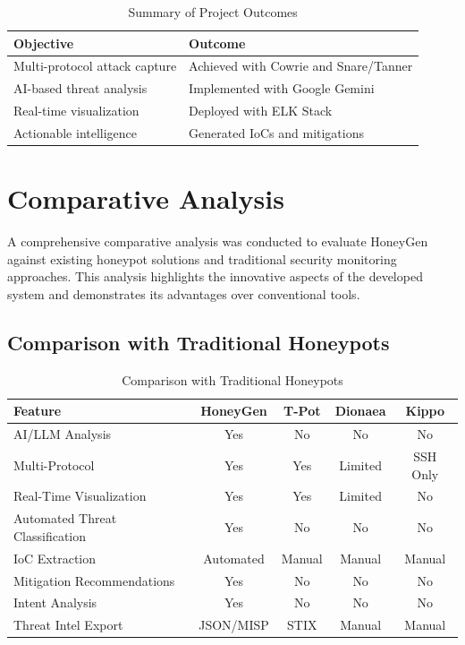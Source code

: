 \documentclass[12pt,a4paper]{report}
\begin{document}
\begin{table}[h]
\centering
\caption{Summary of Project Outcomes}
\label{tab:project_outcomes}
\begin{tabular}{|l|p{8cm}|}
\hline
\textbf{Objective} & \textbf{Outcome} \\
\hline
Multi-protocol attack capture & Achieved with Cowrie and Snare/Tanner \\
\hline
AI-based threat analysis & Implemented with Google Gemini \\
\hline
Real-time visualization & Deployed with ELK Stack \\
\hline
Actionable intelligence & Generated IoCs and mitigations \\
\hline
\end{tabular}
\end{table}

\section{Comparative Analysis}

A comprehensive comparative analysis was conducted to evaluate HoneyGen against existing honeypot solutions and traditional security monitoring approaches. This analysis highlights the innovative aspects of the developed system and demonstrates its advantages over conventional tools.

\subsection{Comparison with Traditional Honeypots}

\begin{table}[h]
\centering
\caption{Comparison with Traditional Honeypots}
\label{tab:comparison}
\begin{tabular}{|l|c|c|c|c|}
\hline
\textbf{Feature} & \textbf{HoneyGen} & \textbf{T-Pot} & \textbf{Dionaea} & \textbf{Kippo} \\
\hline
AI/LLM Analysis & Yes & No & No & No \\
\hline
Multi-Protocol & Yes & Yes & Limited & SSH Only \\
\hline
Real-Time Visualization & Yes & Yes & Limited & No \\
\hline
Automated Threat Classification & Yes & No & No & No \\
\hline
IoC Extraction & Automated & Manual & Manual & Manual \\
\hline
Mitigation Recommendations & Yes & No & No & No \\
\hline
Intent Analysis & Yes & No & No & No \\
\hline
Threat Intel Export & JSON/MISP & STIX & Manual & Manual \\
\hline
\end{tabular}
\end{table}
\end{document}
